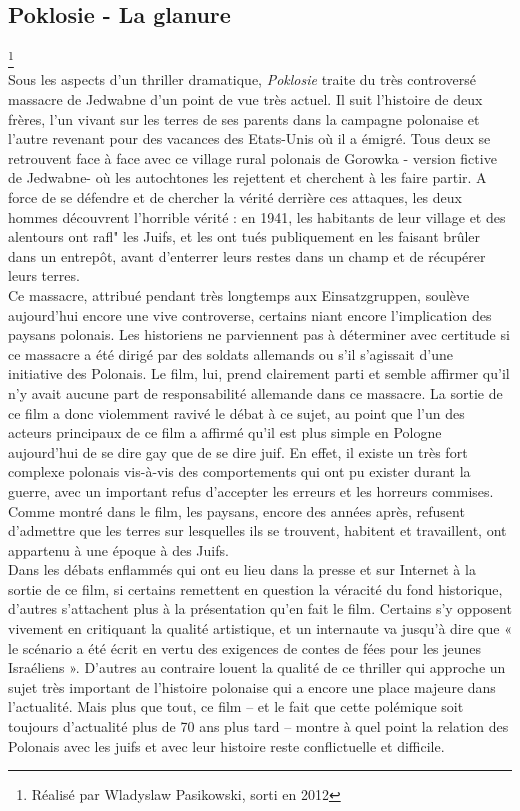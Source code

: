 \documentclass[12pt]{amsart}
\begin{document}
\begin{multicols}{2}
\endgroup

\subsection*{Poklosie - La glanure}\footnote{Réalisé par Wladyslaw Pasikowski, sorti en 2012}\\
Sous les aspects d’un thriller dramatique, \emph{Poklosie} traite du très controversé massacre de Jedwabne d’un point de vue très actuel. Il suit l’histoire de deux frères, l’un vivant sur les terres de ses parents dans la campagne polonaise et l’autre revenant pour des vacances des Etats-Unis où il a émigré. Tous deux se retrouvent face à face avec ce village rural polonais de Gorowka - version fictive de Jedwabne- où les autochtones les rejettent et cherchent à les faire partir. A force de se défendre et de chercher la vérité derrière ces attaques, les deux hommes découvrent l’horrible vérité : en 1941, les habitants de leur village et des alentours ont rafl" les Juifs, et les ont tués publiquement en les faisant brûler dans un entrepôt, avant d’enterrer leurs restes dans un champ et de récupérer leurs terres. \\
Ce massacre, attribué pendant très longtemps aux  Einsatzgruppen, soulève aujourd’hui encore une vive controverse, certains niant encore l’implication des paysans polonais. Les historiens ne parviennent pas à déterminer avec certitude si ce massacre a été dirigé par des soldats allemands ou s’il s’agissait d’une initiative des Polonais. Le film, lui, prend clairement parti et semble affirmer qu’il n’y avait aucune part de responsabilité allemande dans ce massacre. La sortie de ce film a donc violemment ravivé le débat à ce sujet, au point que l’un des acteurs principaux de ce film a affirmé qu’il est plus simple en Pologne aujourd’hui de se dire gay que de se dire juif. En effet, il existe un très fort complexe polonais vis-à-vis des comportements qui ont pu exister durant la guerre, avec un important refus d’accepter les erreurs et les horreurs commises. Comme montré dans le film, les paysans, encore des années après, refusent d’admettre que les terres sur lesquelles ils se trouvent, habitent et travaillent, ont appartenu à une époque à des Juifs. 
\\
Dans les débats enflammés qui ont eu lieu dans la presse et sur Internet à la sortie de ce film, si certains remettent en question la véracité du fond historique, d’autres s’attachent plus à la présentation qu’en fait le film. Certains s’y opposent vivement en critiquant la qualité artistique, et un internaute va jusqu’à dire que « le scénario a été écrit en vertu des exigences de contes de fées pour les jeunes Israéliens ». D’autres au contraire louent la qualité de ce thriller qui approche un sujet très important de l’histoire polonaise qui a encore une place majeure dans l’actualité. Mais plus que tout, ce film – et le fait que cette polémique soit toujours d'actualité plus de 70 ans plus tard – montre à quel point la relation des Polonais avec les juifs et avec leur histoire reste conflictuelle et difficile. 


\end{multicols}
\end{document}

